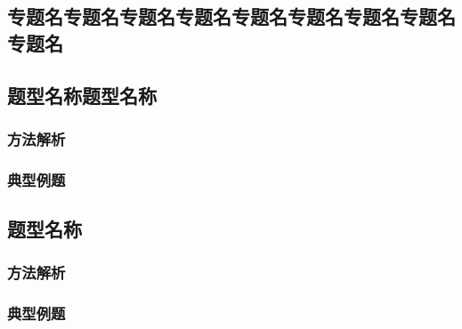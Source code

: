 \documentclass[color=orange]{textbook-cn}%
\begin{document}
\begin{Topic}
\section{专题名专题名专题名专题名专题名专题名专题名专题名专题名}

\begin{Paracol}
\subsection{题型名称题型名称}

\subsubsection{方法解析}
\lipsum[2]


\subsubsection{典型例题}
\lipsum[2]

\Example{\lipsum[1][1-4]}
\Answer{\lipsum[1][1-4]}
\Answer*{\lipsum[1][1-4]}

\Example{\lipsum[1][1-4]}
\Answer{\lipsum[1][1-4]}
\Answer*{\lipsum[1][1-4]}

\subsection{题型名称}

\subsubsection{方法解析}
\lipsum[1-2]

\subsubsection{典型例题}
\lipsum[2]

\Example{\lipsum[1][1-4]}
\Answer{\lipsum[1][1-4]}
\Answer*{\lipsum[1][1-4]}

\Example{\lipsum[1][1-4]}
\Answer{\lipsum[1][1-4]}
\Answer*{\lipsum[1][1-4]}

\end{Paracol}



\end{Topic}
\end{document}
